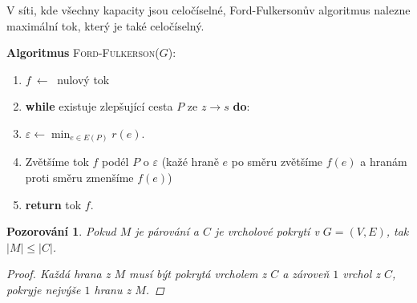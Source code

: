 \documentclass[10pt,a4paper]{article}
\newtheorem{pozorovani}{Pozorování}
\begin{document}
\dusledek \normalfont V síti, kde všechny kapacity jsou celočíselné, Ford-Fulkersonův algoritmus nalezne maximální tok, který je také celočíselný.

\textbf{Algoritmus} \textsc{Ford-Fulkerson}($G$):
\begin{enumerate} \setlength\itemsep{0em}
    \item $f ~\leftarrow~$ nulový tok
    \item \textbf{while} existuje zlepšující cesta $P$ ze $z\to s$ \textbf{do}:
    \item \quad $\varepsilon \leftarrow \min_{e\in E(P)}r(e)$.
    \item \quad Zvětšíme tok $f$ podél $P$ o $\varepsilon$ (kažé hraně $e$ po směru zvětšíme $f(e)$ a hranám proti směru zmenšíme $f(e)$)
    \item \textbf{return} tok $f$.
\end{enumerate}

\begin{pozorovani} Pokud $M$ je párování a $C$ je vrcholové pokrytí v $G=(V, E)$, tak $|M| \leq |C|$.
    \begin{proof}
        Každá hrana z $M$ musí být pokrytá vrcholem z $C$ a zároveň $1$ vrchol z $C$, pokryje nejvýše $1$ hranu z $M$.
    \end{proof}
\end{pozorovani}
\end{document}
